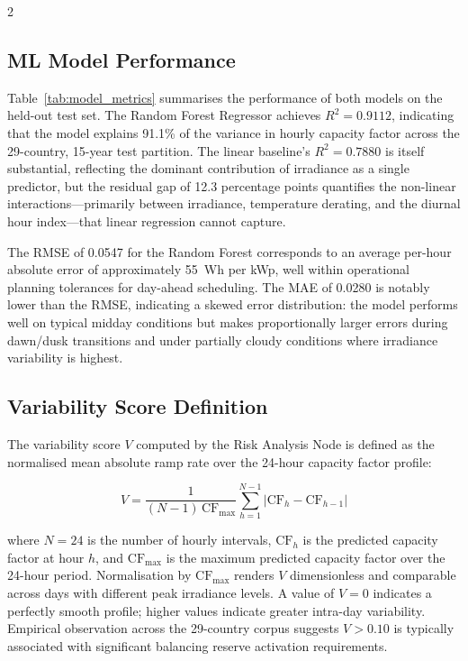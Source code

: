 \documentclass[11pt]{article}
\begin{document}
\begin{multicols}{2}
\subsection{ML Model Performance}

Table~\ref{tab:model_metrics} summarises the performance of both models on the
held-out test set. The Random Forest Regressor achieves $R^2 = 0.9112$,
indicating that the model explains 91.1\% of the variance in hourly capacity
factor across the 29-country, 15-year test partition. The linear baseline's
$R^2 = 0.7880$ is itself substantial, reflecting the dominant contribution of
irradiance as a single predictor, but the residual gap of 12.3 percentage
points quantifies the non-linear interactions---primarily between irradiance,
temperature derating, and the diurnal hour index---that linear regression
cannot capture.

The RMSE of 0.0547 for the Random Forest corresponds to an average per-hour
absolute error of approximately 55~Wh per kWp, well within operational planning
tolerances for day-ahead scheduling. The MAE of 0.0280 is notably lower than
the RMSE, indicating a skewed error distribution: the model performs well on
typical midday conditions but makes proportionally larger errors during
dawn/dusk transitions and under partially cloudy conditions where irradiance
variability is highest.

\subsection{Variability Score Definition}

The variability score $V$ computed by the Risk Analysis Node is defined as the
normalised mean absolute ramp rate over the 24-hour capacity factor profile:

\begin{equation}
  V = \frac{1}{(N-1)\,\mathrm{CF}_{\max}}
      \sum_{h=1}^{N-1} \bigl|\mathrm{CF}_{h} - \mathrm{CF}_{h-1}\bigr|
  \label{eq:variability}
\end{equation}

\noindent where $N = 24$ is the number of hourly intervals, $\mathrm{CF}_h$
is the predicted capacity factor at hour $h$, and $\mathrm{CF}_{\max}$ is the
maximum predicted capacity factor over the 24-hour period. Normalisation by
$\mathrm{CF}_{\max}$ renders $V$ dimensionless and comparable across days with
different peak irradiance levels. A value of $V = 0$ indicates a perfectly
smooth profile; higher values indicate greater intra-day variability. Empirical
observation across the 29-country corpus suggests $V > 0.10$ is typically
associated with significant balancing reserve activation requirements.


\end{multicols}
\end{document}
